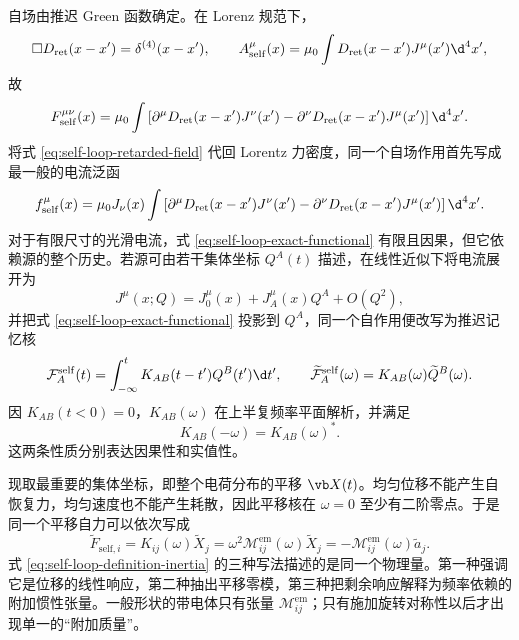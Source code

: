 自场由推迟 Green 函数确定。在 Lorenz 规范下，
\begin{equation}
 \Box D_{\mathrm{ret}}(x-x')=\delta^{(4)}(x-x'),
 \qquad
 A_{\mathrm{self}}^\mu(x)
 =\mu_0\int D_{\mathrm{ret}}(x-x')J^\mu(x')\d^4x',
 \label{eq:self-loop-retarded-potential}
\end{equation}
故
\begin{equation}
 F_{\mathrm{self}}^{\mu\nu}(x)
 =\mu_0\int
 \left[
 \partial^\mu D_{\mathrm{ret}}(x-x')J^\nu(x')
 -\partial^\nu D_{\mathrm{ret}}(x-x')J^\mu(x')
 \right]\d^4x'.
 \label{eq:self-loop-retarded-field}
\end{equation}
将式 \eqref{eq:self-loop-retarded-field} 代回 Lorentz 力密度，同一个自场作用首先写成最一般的电流泛函
\begin{equation}
 f_{\mathrm{self}}^\mu(x)
 =\mu_0J_\nu(x)\int
 \left[
 \partial^\mu D_{\mathrm{ret}}(x-x')J^\nu(x')
 -\partial^\nu D_{\mathrm{ret}}(x-x')J^\mu(x')
 \right]\d^4x'.
 \label{eq:self-loop-exact-functional}
\end{equation}
对于有限尺寸的光滑电流，式 \eqref{eq:self-loop-exact-functional} 有限且因果，但它依赖源的整个历史。若源可由若干集体坐标 $Q^A(t)$ 描述，在线性近似下将电流展开为
\begin{equation*}
 J^\mu(x;Q)=J_0^\mu(x)+J_A^\mu(x)Q^A+O(Q^2),
\end{equation*}
并把式 \eqref{eq:self-loop-exact-functional} 投影到 $Q^A$，同一个自作用便改写为推迟记忆核
\begin{equation}
 \mathcal F_A^{\mathrm{self}}(t)
 =\int_{-\infty}^tK_{AB}(t-t')Q^B(t')\d t',
 \qquad
 \widetilde{\mathcal F}_A^{\mathrm{self}}(\omega)
 =K_{AB}(\omega)\widetilde Q^B(\omega).
 \label{eq:self-loop-memory-kernel}
\end{equation}
因 $K_{AB}(t<0)=0$，$K_{AB}(\omega)$ 在上半复频率平面解析，并满足
\begin{equation*}
 K_{AB}(-\omega)=K_{AB}(\omega)^*.
\end{equation*}
这两条性质分别表达因果性和实值性。

现取最重要的集体坐标，即整个电荷分布的平移 $\vb X(t)$。均匀位移不能产生自恢复力，均匀速度也不能产生耗散，因此平移核在 $\omega=0$ 至少有二阶零点。于是同一个平移自力可以依次写成
\begin{equation}
 \widetilde F_{\mathrm{self},i}
 =K_{ij}(\omega)\widetilde X_j
 =\omega^2\mathcal M_{ij}^{\mathrm{em}}(\omega)\widetilde X_j
 =-\mathcal M_{ij}^{\mathrm{em}}(\omega)\widetilde a_j.
 \label{eq:self-loop-definition-inertia}
\end{equation}
式 \eqref{eq:self-loop-definition-inertia} 的三种写法描述的是同一个物理量。第一种强调它是位移的线性响应，第二种抽出平移零模，第三种把剩余响应解释为频率依赖的附加惯性张量。一般形状的带电体只有张量 $\mathcal M_{ij}^{\mathrm{em}}$；只有施加旋转对称性以后才出现单一的“附加质量”。

